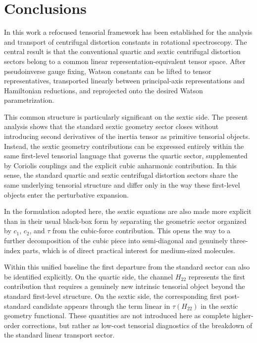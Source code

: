 \section{Conclusions}

In this work a refocused tensorial framework has been established for the
analysis and transport of centrifugal distortion constants in rotational
spectroscopy. The central result is that the conventional quartic and
sextic centrifugal distortion sectors belong to a common linear
representation-equivalent tensor space. After pseudoinverse gauge fixing,
Watson constants can be lifted to tensor representatives, transported
linearly between principal-axis representations and Hamiltonian
reductions, and reprojected onto the desired Watson parametrization.

This common structure is particularly significant on the sextic side.
The present analysis shows that the standard sextic geometry sector
closes without introducing second derivatives of the inertia tensor as
primitive tensorial objects. Instead, the sextic geometry contributions
can be expressed entirely within the same first-level tensorial language
that governs the quartic sector, supplemented by Coriolis couplings and
the explicit cubic anharmonic contribution. In this sense, the standard
quartic and sextic centrifugal distortion sectors share the same
underlying tensorial structure and differ only in the way these
first-level objects enter the perturbative expansion.

In the formulation adopted here, the sextic equations are also made more
explicit than in their usual black-box form by separating the geometric
sector organized by $c_1$, $c_2$, and $\tau$ from the cubic-force
contribution. This opens the way to a further decomposition of the cubic
piece into semi-diagonal and genuinely three-index parts, which is of
direct practical interest for medium-sized molecules.

Within this unified baseline the first departure from the standard sector
can also be identified explicitly. On the quartic side, the channel
$H_{22}$ represents the first contribution that requires a genuinely new
intrinsic tensorial object beyond the standard first-level structure.
On the sextic side, the corresponding first post-standard candidate
appears through the term linear in $\tau(H_{22})$ in the sextic geometry
functional. These quantities are not introduced here as complete
higher-order corrections, but rather as low-cost tensorial diagnostics of
the breakdown of the standard linear transport sector.

